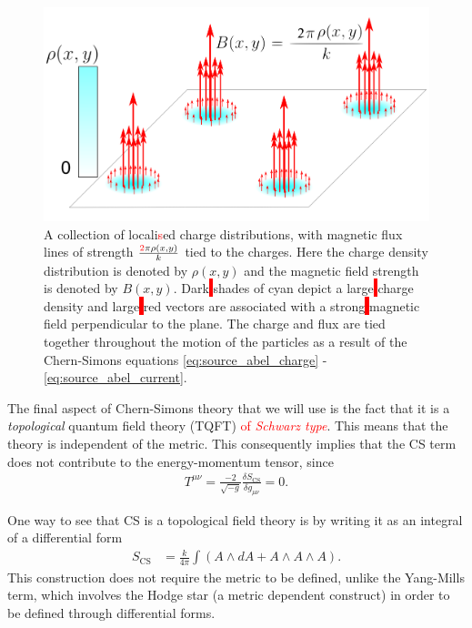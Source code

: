 \begin{figure}[htb]
	\centering
		\includegraphics[scale=0.17]{Background_Folder/figures/Flux_Attachment_3.pdf}
    \caption[This figure depicts magnetic flux attachment.]{A collection of locali\textcolor{red}{s}ed charge distributions, \colorbox{red}{ } with magnetic flux lines of strength $\frac{\textcolor{red}{2} \pi \rho(x,y)}{k}$ tied to the charges. Here the charge density distribution is denoted by $\rho(x,y)$ and the magnetic field strength is denoted by $B(x,y)$. Dark\colorbox{red}{ } shades of cyan depict a large\colorbox{red}{ } charge density and large\colorbox{red}{ } red vectors are associated with a strong\colorbox{red}{ } magnetic field perpendicular to the plane.  The charge and flux are tied together throughout the motion of the particles as a result of the Chern-Simons equations \eqref{eq:source_abel_charge} - \eqref{eq:source_abel_current}.} \label{fig:flux_attachment}
\end{figure}

The final aspect of Chern-Simons theory that we will use is the fact that it is a \textit{topological} quantum field theory (TQFT) \textcolor{red}{of \textit{Schwarz type}}. This means that the theory is independent of the metric. This consequently implies that the CS term does not contribute to the energy-momentum tensor, since
\begin{align}
    T^{\mu \nu} = \frac{-2}{ \sqrt{-g}} \frac{\delta S_{\text{CS}}}{ \delta g_{\mu\nu}} =0.
\end{align}

One way to see that CS is a topological field theory is by writing it as an integral of a differential form
\begin{align}
    S_{\text{CS}} &= \frac{k}{4 \pi} \int \left(A \wedge dA +A \wedge A \wedge A\right).
\end{align}
This construction does not require the metric to be defined, unlike the Yang-Mills term, which involves the Hodge star (a metric dependent construct) in order to be defined through differential forms.

